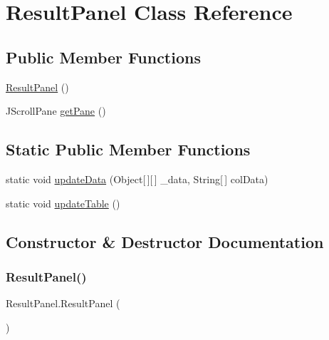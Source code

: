 \hypertarget{class_result_panel}{}\section{Result\+Panel Class Reference}
\label{class_result_panel}
\subsection*{Public Member Functions}
\begin{DoxyCompactItemize}
\item 
\hyperlink{class_result_panel_a1f0864074da52caf14581a14b2574d48}{Result\+Panel} ()
\item 
J\+Scroll\+Pane \hyperlink{class_result_panel_ace0f4c9bd2c1ddadc0e0484ac9da3d2b}{get\+Pane} ()
\end{DoxyCompactItemize}
\subsection*{Static Public Member Functions}
\begin{DoxyCompactItemize}
\item 
static void \hyperlink{class_result_panel_a46714631f37ba703978bdd94e6a666d3}{update\+Data} (Object\mbox{[}$\,$\mbox{]}\mbox{[}$\,$\mbox{]} \+\_\+data, String\mbox{[}$\,$\mbox{]} col\+Data)
\item 
static void \hyperlink{class_result_panel_a91bbedbe216c200121a25a629bdc6d2f}{update\+Table} ()
\end{DoxyCompactItemize}


\subsection{Constructor \& Destructor Documentation}
\hypertarget{class_result_panel_a1f0864074da52caf14581a14b2574d48}{}\label{class_result_panel_a1f0864074da52caf14581a14b2574d48} 
\subsubsection{\texorpdfstring{Result\+Panel()}{ResultPanel()}}
{\footnotesize\ttfamily Result\+Panel.\+Result\+Panel (\begin{DoxyParamCaption}{ }\end{DoxyParamCaption})}



